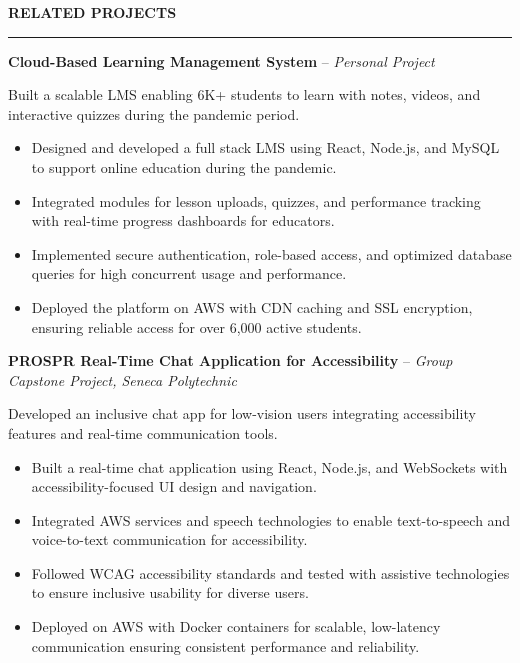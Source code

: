 \documentclass[10pt,letterpaper]{article}
\begin{document}
\vspace{6pt}

\textbf{RELATED PROJECTS}\\[-8pt]
\noindent\rule{\textwidth}{1pt}

\vspace{-2pt}

\textbf{Cloud-Based Learning Management System} -- \emph{Personal Project}

\vspace{-1pt}

Built a scalable LMS enabling 6K+ students to learn with notes, videos, and interactive quizzes during the pandemic period.
\vspace{-1pt}
\begin{itemize}
\item Designed and developed a full stack LMS using React, Node.js, and MySQL to support online education during the pandemic.
\item Integrated modules for lesson uploads, quizzes, and performance tracking with real-time progress dashboards for educators.
\item Implemented secure authentication, role-based access, and optimized database queries for high concurrent usage and performance.
\item Deployed the platform on AWS with CDN caching and SSL encryption, ensuring reliable access for over 6,000 active students.
\end{itemize}

\textbf{PROSPR  Real-Time Chat Application for Accessibility} -- \emph{Group Capstone Project, Seneca Polytechnic}

\vspace{-1pt}

Developed an inclusive chat app for low-vision users integrating accessibility features and real-time communication tools.
\vspace{-1pt}
\begin{itemize}
\item Built a real-time chat application using React, Node.js, and WebSockets with accessibility-focused UI design and navigation.
\item Integrated AWS services and speech technologies to enable text-to-speech and voice-to-text communication for accessibility.
\item Followed WCAG accessibility standards and tested with assistive technologies to ensure inclusive usability for diverse users.
\item Deployed on AWS with Docker containers for scalable, low-latency communication ensuring consistent performance and reliability.
\end{itemize}
\end{document}
